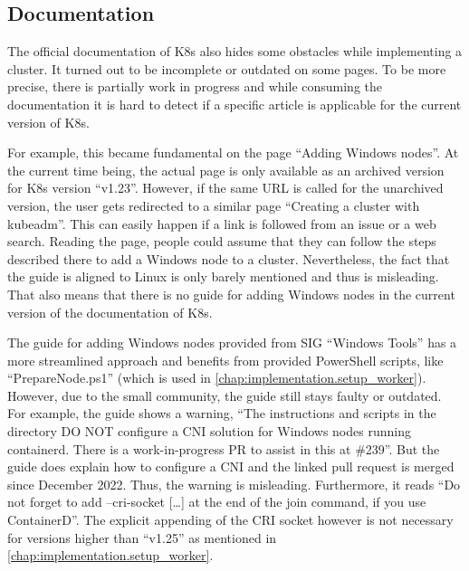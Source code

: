 \subsection{Documentation}
The official documentation of \ac{K8s} also hides some obstacles while implementing a cluster. It turned out to be incomplete or outdated on some pages.
To be more precise, there is partially work in progress and while consuming the documentation it is hard to detect if a specific article is applicable for the current version of \ac{K8s}.

For example, this became fundamental on the page \enquote{Adding Windows nodes}\cite{Kubernetes.20220419}. At the current time being, the actual page is only available as an archived version for \ac{K8s} version \enquote{v1.23}. However, if the same \ac{URL} is called for the unarchived version, the user gets redirected to a similar page \enquote{Creating a cluster with kubeadm}\cite{Kubernetes.20221107}. This can easily happen if a link is followed from an issue or a web search. Reading the page, people could assume that they can follow the steps described there to add a \ac{Windows} node to a cluster. Nevertheless, the fact that the guide is aligned to Linux is only barely mentioned and thus is misleading.
That also means that there is no guide for adding \ac{Windows} nodes in the current version of the documentation of \ac{K8s}.

The guide for adding \ac{Windows} nodes provided from \ac{SIG} \enquote{Windows Tools}\cite{GitHubKubernetesSIGWindowsTools.20230213} has a more streamlined approach and benefits from provided PowerShell scripts, like \enquote{PrepareNode.ps1} (which is used in \autoref{chap:implementation.setup_worker}). However, due to the small community\cite{Github.2022}, the guide still stays faulty or outdated. For example, the guide shows a warning, \enquote{The instructions and scripts in the directory DO NOT configure a CNI solution for Windows nodes running containerd. There is a work-in-progress PR to assist in this at \#239}\cite{GitHubKubernetesSIGWindowsTools.20230213}. But the guide does explain how to configure a \ac{CNI} and the linked pull request is merged since December 2022. Thus, the warning is misleading.
Furthermore, it reads \enquote{Do not forget to add --cri-socket [\dots] at the end of the join command, if you use ContainerD}\cite{GitHubKubernetesSIGWindowsTools.20230213}. The explicit appending of the \ac{CRI} socket however is not necessary for versions higher than \enquote{v1.25} as mentioned in \autoref{chap:implementation.setup_worker}.

